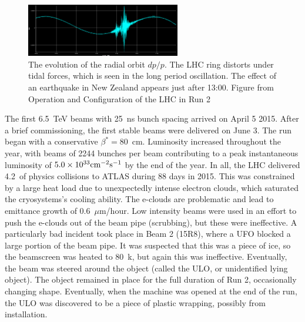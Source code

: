 \begin{figure}[h!]
\captionsetup[subfigure]{position=b}
\centering
\includegraphics[width=0.6\textwidth]{figures/experiment/lhc/tides.png}
\caption{The evolution of the radial orbit $dp/p$. The LHC ring distorts under tidal forces, which is seen in the long period oscillation. The effect of an earthquake in New Zealand appears just after 13:00. Figure from Operation and Configuration of the LHC in Run 2 \cite{lhcRun2}}
\label{fig:tides}
\end{figure}

The first 6.5~TeV beams with 25~ns bunch spacing arrived on April 5 2015.
After a brief commissioning, the first stable beams were delivered on June 3.
The run began with a conservative $\beta^*=80$~cm.
Luminosity increased throughout the year, with beams of 2244 bunches per beam contributing to a peak instantaneous luminosity of $5.0\times10^{33}\text{cm}^{-2}\text{s}^{-1}$ by the end of the year.
In all, the LHC delivered 4.2~\fb of physics collisions to ATLAS during 88 days in 2015.
This was constrained by a large heat load due to unexpectedly intense electron clouds, which saturated the cryosystems's cooling ability.
The e-clouds are problematic and lead to emittance growth of 0.6~$\mu$m/hour.
Low intensity beams were used in an effort to push the e-clouds out of the beam pipe (scrubbing), but these were ineffective.
A particularly bad incident took place in Beam 2 (15R8), where a UFO blocked a large portion of the beam pipe.
It was suspected that this was a piece of ice, so the beamscreen was heated to 80~k, but again this was ineffective.
Eventually, the beam was steered around the object (called the ULO, or unidentified lying object).
The object remained in place for the full duration of Run 2, occasionally changing shape.
Eventually, when the machine was opened at the end of the run, the ULO was discovered to be a piece of plastic wrapping, possibly from installation.

